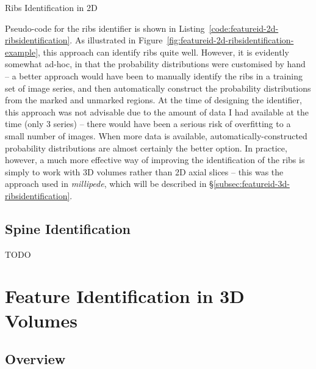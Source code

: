 \begin{stulisting}[p]
\caption{Ribs Identification in 2D}
\label{code:featureid-2d-ribsidentification}

\end{stulisting}

Pseudo-code for the ribs identifier is shown in Listing~\ref{code:featureid-2d-ribsidentification}. As illustrated in Figure~\ref{fig:featureid-2d-ribsidentification-example}, this approach can identify ribs quite well. However, it is evidently somewhat ad-hoc, in that the probability distributions were customised by hand -- a better approach would have been to manually identify the ribs in a training set of image series, and then automatically construct the probability distributions from the marked and unmarked regions. At the time of designing the identifier, this approach was not advisable due to the amount of data I had available at the time (only $3$ series) -- there would have been a serious risk of overfitting to a small number of images. When more data is available, automatically-constructed probability distributions are almost certainly the better option. In practice, however, a much more effective way of improving the identification of the ribs is simply to work with 3D volumes rather than 2D axial slices -- this was the approach used in \emph{millipede}, which will be described in \S\ref{subsec:featureid-3d-ribsidentification}.

\subsection{Spine Identification}

TODO

\afterpage{\clearpage}
\newpage

\section{Feature Identification in 3D Volumes}

\subsection{Overview}

